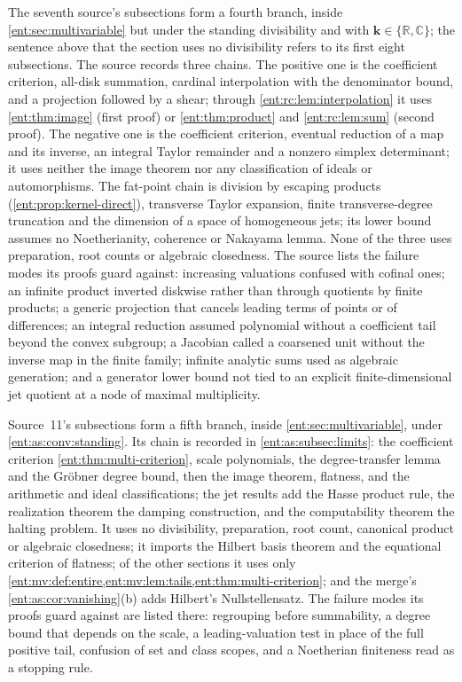 \documentclass[11pt]{article}
\theoremstyle{plain}
\theoremstyle{plain}
\theoremstyle{plain}
\theoremstyle{definition}
\theoremstyle{definition}
\theoremstyle{definition}
\theoremstyle{definition}
\theoremstyle{remark}
\newcommand{\C}{\mathbb C}\newcommand{\R}{\mathbb R}
\newcommand{\kk}{\mathbf k}\newcommand{\PP}{\mathbb P}
\begin{document}
The seventh source's subsections
 form a fourth branch,
inside \cref{ent:sec:multivariable} but under the standing divisibility and
with $\kk\in\{\R,\C\}$; the sentence above that the section uses no
divisibility refers to its first eight subsections. The source records three
chains. The positive one is the coefficient criterion, all-disk summation,
cardinal interpolation with the denominator bound, and a projection followed
by a shear; through \cref{ent:rc:lem:interpolation} it uses
\cref{ent:thm:image} (first proof) or \cref{ent:thm:product} and
\cref{ent:rc:lem:sum} (second proof). The negative one is the coefficient
criterion, eventual reduction of a map and its inverse, an integral Taylor
remainder and a nonzero simplex determinant; it uses neither the image theorem
nor any classification of ideals or automorphisms. The fat-point chain is
division by escaping products (\cref{ent:prop:kernel-direct}), transverse
Taylor expansion, finite transverse-degree truncation and the dimension of a
space of homogeneous jets; its lower bound assumes no Noetherianity, coherence
or Nakayama lemma. None of the three uses preparation, root counts or
algebraic closedness. The source lists the failure modes its proofs guard
against: increasing valuations confused with cofinal ones; an infinite product
inverted diskwise rather than through quotients by finite products; a generic
projection that cancels leading terms of points or of differences; an integral
reduction assumed polynomial without a coefficient tail beyond the convex
subgroup; a Jacobian called a coarsened unit without the inverse map in the
finite family; infinite analytic sums used as algebraic generation; and a
generator lower bound not tied to an explicit finite-dimensional jet quotient
at a node of maximal multiplicity.

Source~11's subsections
 form a fifth branch,
inside \cref{ent:sec:multivariable}, under \cref{ent:as:conv:standing}. Its
chain is recorded in \cref{ent:as:subsec:limits}: the coefficient criterion
\cref{ent:thm:multi-criterion}, scale polynomials, the degree-transfer lemma
and the Gr\"obner degree bound, then the image theorem, flatness, and the
arithmetic and ideal classifications; the jet results add the Hasse product
rule, the realization theorem the damping construction, and the computability
theorem the halting problem. It uses no divisibility, preparation, root count,
canonical product or algebraic closedness; it imports the Hilbert basis
theorem and the equational criterion of flatness; of the other sections it uses
only \cref{ent:mv:def:entire,ent:mv:lem:tails,ent:thm:multi-criterion}; and the
merge's \cref{ent:as:cor:vanishing}(b) adds Hilbert's Nullstellensatz. The
failure modes its proofs guard against are listed there: regrouping before
summability, a degree bound that depends on the scale, a leading-valuation
test in place of the full positive tail, confusion of set and class scopes,
and a Noetherian finiteness read as a stopping rule.
\end{document}
